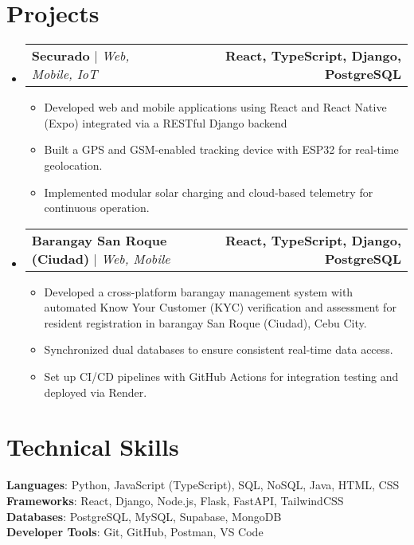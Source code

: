 \documentclass[letterpaper,11pt]{article}
\makeatletter
\newcommand{\resumeItem}[1]{
  \item\small{
    {#1 \vspace{0pt}}
  }
}
\newcommand{\resumeProjectHeading}[2]{
    \item
    \begin{tabular*}{1.001\textwidth}{l@{\extracolsep{\fill}}r}
      \small#1 & \textbf{\small #2}\\
    \end{tabular*}\vspace{-7pt}
}
\newcommand{\resumeSubHeadingListStart}{\begin{itemize}[leftmargin=0.0in, label={}]}
\newcommand{\resumeSubHeadingListEnd}{\end{itemize}}\vspace{0pt}
\newcommand{\resumeItemListStart}{\begin{itemize}}
\newcommand{\resumeItemListEnd}{\end{itemize}\vspace{-5pt}}
\makeatother
\begin{document}
\section{Projects} 
    \vspace{-5pt}
    \resumeSubHeadingListStart
    \resumeProjectHeading{\textbf{Securado} $|$ \emph{Web, Mobile, IoT}}{React, TypeScript, Django, PostgreSQL}
      \resumeItemListStart
        \resumeItem{Developed web and mobile applications using React and React Native (Expo) integrated via a RESTful Django backend}
        \resumeItem{Built a GPS and GSM-enabled tracking device with ESP32 for real-time geolocation.}
        \resumeItem{Implemented modular solar charging and cloud-based telemetry for continuous operation.}
      \resumeItemListEnd
    \vspace{-20pt}
    \resumeProjectHeading
      {\textbf{Barangay San Roque (Ciudad)} $|$ \emph{Web, Mobile}}{React, TypeScript, Django, PostgreSQL}
      \resumeItemListStart
        \resumeItem{Developed a cross-platform barangay management system with automated Know Your Customer (KYC) verification and assessment for resident registration in barangay San Roque (Ciudad), Cebu City.}
        \resumeItem{Synchronized dual databases to ensure consistent real-time data access.}
        \resumeItem{Set up CI/CD pipelines with GitHub Actions for integration testing and deployed via Render.}
      \resumeItemListEnd
\resumeSubHeadingListEnd
\vspace{-12pt}

\section{Technical Skills}
 \begin{itemize}[leftmargin=0.15in, label={}]
    \small{\item{   
      \textbf{Languages}{: Python, JavaScript (TypeScript), SQL, NoSQL, Java, HTML, CSS} \\[1mm]
      \textbf{Frameworks}{: React, Django, Node.js, Flask, FastAPI, TailwindCSS} \\[1mm]
      \textbf{Databases}{: PostgreSQL, MySQL, Supabase, MongoDB} \\[1mm]
      \textbf{Developer Tools}{: Git, GitHub, Postman, VS Code}
    }}
 \end{itemize}
 \vspace{-16pt}
 \vspace{3pt}
\vspace{10pt}

\vspace{-15pt}
\end{document}
